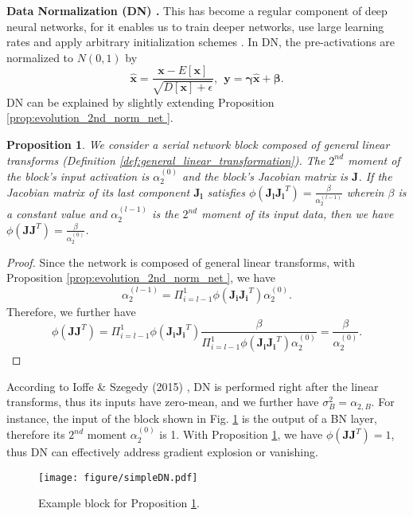 \documentclass[10pt,journal,compsoc]{IEEEtran}
\newtheorem{prop}{Proposition}[section]
\begin{document}
\textbf{Data Normalization (DN) \cite{ioffe2015batch, ulyanov2016instance, wu2018group}.} This has become a regular component of deep neural networks, for it enables us to train deeper networks, use large learning rates and apply arbitrary initialization schemes \cite{ioffe2015batch}. In DN, the pre-activations are normalized to $N(0, 1)$ by
\begin{equation}
    \hat{\mathbf{x}} = \frac{\mathbf{x} - E[\mathbf{x}]}{\sqrt{D[\mathbf{x}] + \epsilon}},~~\mathbf{y} = \mathbf{\gamma}\hat{\mathbf{x}} + \mathbf{\beta}.
\label{equ:data_normalization}
\end{equation}
DN can be explained by slightly extending Proposition \ref{prop:evolution_2nd_norm_net }.
\begin{prop}
    We consider a serial network block composed of general linear transforms (Definition \ref{def:general_linear_transformation}). The $2^{nd}$ moment of the block's input activation is  $\alpha_2^{(0)}$ and the block's Jacobian matrix is $\mathbf{J}$. If the Jacobian matrix of its last component $\mathbf{J_l}$ satisfies $\phi(\mathbf{J_lJ_l}^T)=\frac{\beta}{\alpha_2^{(l-1)}}$ wherein $\beta$ is a constant value and $\alpha_2^{(l-1)}$ is the $2^{nd}$ moment of its input data, then we have $\phi(\mathbf{JJ}^T)=\frac{\beta}{\alpha_2^{(0)}}$.
\label{coro:bn_explain}
\end{prop}

\begin{proof}
Since the network is composed of general linear transforms, with Proposition \ref{prop:evolution_2nd_norm_net }, we have
\begin{equation}
    \alpha_2^{(l-1)}=\Pi_{i=l-1}^1\phi\left(\mathbf{J_iJ_i}^T\right)\alpha_2^{(0)}
\label{equ:le_pre_info}.
\end{equation}
Therefore, we further have
\begin{equation}
    \phi\left(\mathbf{JJ}^T\right) =\Pi_{i=l-1}^1\phi\left(\mathbf{J_iJ_i}^T\right)\frac{\beta}{\Pi_{i=l-1}^1\phi\left(\mathbf{J_iJ_i}^T\right)\alpha_2^{(0)}}\!=\!\frac{\beta}{\alpha_2^{(0)}}.
\end{equation}
\end{proof}

According to Ioffe \& Szegedy (2015) \cite{ioffe2015batch}, DN is performed right after the linear transforms, thus its inputs have zero-mean, and we further have $\sigma_B^2=\alpha_{2,B}$. For instance, the input of the block shown in Fig. \ref{fig:simpleDN} is the output of a BN layer, therefore its $2^{nd}$ moment $\alpha_2^{(0)}$ is 1. With Proposition \ref{coro:bn_explain}, we have $\phi(\mathbf{JJ}^T)=1$, thus DN can effectively address gradient explosion or vanishing.
\begin{figure}[ht!]
\centering
\texttt{[image: figure/simpleDN.pdf]}
\caption{Example block for Proposition \ref{coro:bn_explain}.}
\label{fig:simpleDN}
\vspace{-5pt}
\end{figure}
\end{document}
